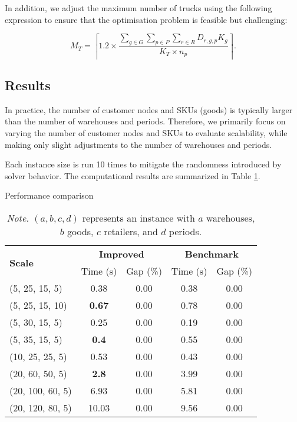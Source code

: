 \documentclass[a4paper,12pt]{article}
\begin{document}
In addition, we adjust the maximum number of trucks using the following expression to ensure that the optimisation problem is feasible but challenging:

$$
M_T = \left\lceil 1.2 \times \frac{\sum_{g \in G}\sum_{p \in P} \sum_{r \in R} D_{r,g,p}K_g}{K_T \times n_p} \right\rceil.
$$


\subsection{Results}\label{subsec:results}

In practice, the number of customer nodes and SKUs (goods) is typically larger than the number of warehouses and periods.
Therefore, we primarily focus on varying the number of customer nodes and SKUs to evaluate scalability, while making only slight adjustments to the number of warehouses and periods.

Each instance size is run 10 times to mitigate the randomness introduced by solver behavior.
The computational results are summarized in Table \ref{tab:method-comparison}.

\begin{table}[htbp]
    \centering
    \caption{Performance comparison}
    \label{tab:method-comparison}
    \begin{tabular}{lcc|cc}
        \toprule
        \multirow{2}{*}{\textbf{Scale}} & \multicolumn{2}{c|}{\textbf{Improved}} & \multicolumn{2}{c}{\textbf{Benchmark}} \\
        & Time (s) & Gap (\%) & Time (s) & Gap (\%) \\
        \midrule
        (5, 25, 15, 5)   & 0.38 & 0.00 & 0.38  & 0.00  \\
        (5, 25, 15, 10)   & \textbf{0.67} & 0.00 & 0.78  & 0.00  \\
        (5, 30, 15, 5)   & 0.25  & 0.00 & 0.19  & 0.00  \\
        (5, 35, 15, 5)  & \textbf{0.4}  & 0.00 & 0.55  & 0.00 \\
        (10, 25, 25, 5) & 0.53 & 0.00 & 0.43 & 0.00 \\
        (20, 60, 50, 5) & \textbf{2.8} & 0.00 & 3.99 & 0.00 \\
        (20, 100, 60, 5) & 6.93 & 0.00 & 5.81 & 0.00 \\
        (20, 120, 80, 5) & 10.03 & 0.00 & 9.56 & 0.00 \\
        \bottomrule
    \end{tabular}
    \captionsetup{justification=justified,singlelinecheck=false}
    \caption*{\footnotesize \textit{Note.} $(a, b, c, d)$ represents an instance with $a$ warehouses, $b$ goods, $c$ retailers, and $d$ periods.}
\end{table}
\end{document}
